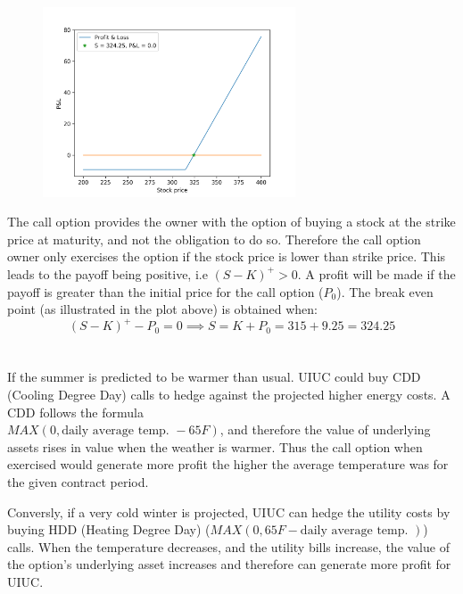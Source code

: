 \documentclass{article}
\begin{document}
\begin{figure}[H]
	\centering
	\includegraphics[width=75mm]{pl.png}
\end{figure}
The call option provides the owner with the option of buying a stock at the strike price at maturity, and not the obligation to do so. Therefore the call option owner only exercises the option if the stock price is lower than strike price. This leads to the payoff being positive, i.e $(S-K)^+ > 0$. A profit will be made if the payoff is greater than the initial price for the call option ($P_0$). The break even point (as illustrated in the plot above) is obtained when: 
$$(S-K)^+ - P_0 = 0 \implies S = K + P_0 = 315 + 9.25 = 324.25$$

\section{}

If the summer is predicted to be warmer than usual. UIUC could buy CDD (Cooling Degree Day) calls to hedge against the projected higher energy costs. A CDD follows the formula \\ 
$MAX(0, \text{daily average temp. } - 65 F)$, and therefore the value of underlying assets rises in value when the weather is warmer. Thus the call option when exercised would generate more profit the higher the average temperature was for the given contract period.

Conversly, if a very cold winter is projected, UIUC can hedge the utility costs by buying HDD (Heating Degree Day) ($MAX(0, 65F - \text{daily average temp. })$) calls. When the temperature decreases, and the utility bills increase, the value of the option's underlying asset increases and therefore can generate more profit for UIUC.
\end{document}
